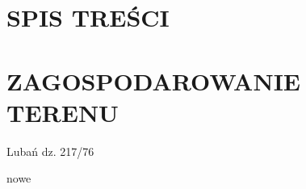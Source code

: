 \documentclass{article}
\def \adresDzialki {Lubań dz. 217/76}
\begin{document}
\section{SPIS TREŚCI}
\tableofcontents

\newpage

\section{ZAGOSPODAROWANIE TERENU}

\adresDzialki

nowe
\end{document}
